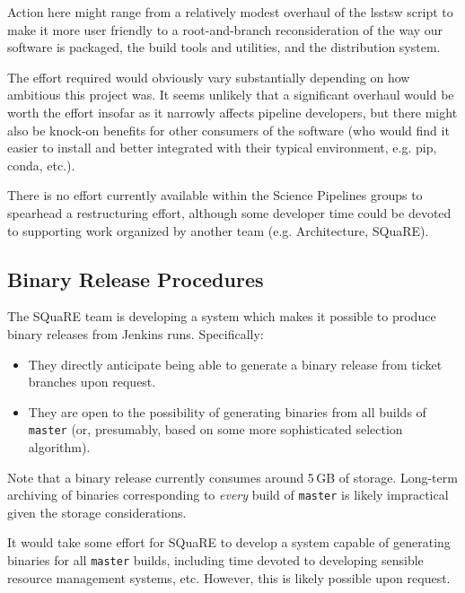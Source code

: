 \documentclass[letterpaper]{scrartcl}
\begin{document}
Action here might range from a relatively modest overhaul of the lsstsw script
to make it more user friendly to a root-and-branch reconsideration of the way
our software is packaged, the build tools and utilities, and the distribution
system.

The effort required would obviously vary substantially depending on how
ambitious this project was. It seems unlikely that a significant overhaul
would be worth the effort insofar as it narrowly affects pipeline developers,
but there might also be knock-on benefits for other consumers of the software
(who would find it easier to install and better integrated with their typical
environment, e.g. pip, conda, etc.).

There is no effort currently available within the Science Pipelines groups to
spearhead a restructuring effort, although some developer time could be
devoted to supporting work organized by another team (e.g. Architecture,
SQuaRE).

\subsection{Binary Release Procedures}
\label{sec:binaryrelease}

The SQuaRE team is developing a system which makes it possible to produce
binary releases from Jenkins runs. Specifically:

\begin{itemize}

  \item{They directly anticipate being able to generate a binary release from
  ticket branches upon request.}

  \item{They are open to the possibility of generating binaries from all
  builds of \texttt{master} (or, presumably, based on some more sophisticated
  selection algorithm).}

\end{itemize}

Note that a binary release currently consumes around 5\,GB of storage.
Long-term archiving of binaries corresponding to \textit{every} build of
\texttt{master} is likely impractical given the storage considerations.

It would take some effort for SQuaRE to develop a system capable of generating
binaries for all \texttt{master} builds, including time devoted to developing
sensible resource management systems, etc. However, this is likely possible
upon request.
\end{document}

